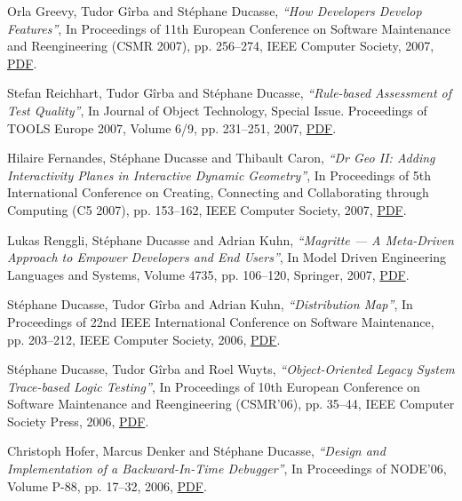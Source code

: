 \documentclass{article}
\newcommand{\czauthors}[1]{#1}
\newcommand{\cztitle}[1]{\emph{``#1''}}
\newcommand{\czbooktitle}[1]{#1}
\begin{document}
\begin{itemize}
	\pub  \czauthors{Orla Greevy, Tudor G\^irba and St\'ephane Ducasse},  \cztitle{How Developers Develop Features},  In \czbooktitle{Proceedings of 11th European Conference on Software Maintenance and Reengineering (CSMR 2007)}, pp. 256--274, IEEE Computer Society, 2007, \href{http://rmod-files.lille.inria.fr/Team/Texts/Papers/Gree07aDevelopersDevelopFeatures.pdf}{PDF}.

	\pub  \czauthors{Stefan Reichhart, Tudor G\^irba and St\'ephane Ducasse},  \cztitle{Rule-based Assessment of Test Quality},  In \czbooktitle{Journal of Object Technology, Special Issue. Proceedings of TOOLS Europe 2007}, Volume 6/9, pp. 231--251, 2007, \href{http://rmod-files.lille.inria.fr/Team/Texts/Papers/Reic07aTestQualityAssessment.pdf}{PDF}.

	\pub  \czauthors{Hilaire Fernandes, St\'ephane Ducasse and Thibault Caron},  \cztitle{{Dr Geo II}: Adding Interactivity Planes in Interactive Dynamic Geometry},  In \czbooktitle{Proceedings of 5th International Conference on Creating, Connecting and Collaborating through Computing (C5 2007)}, pp. 153--162, IEEE Computer Society, 2007, \href{http://rmod-files.lille.inria.fr/Team/Texts/Papers/Fern07a-C5-DrIIInterfactiveMultimodal.pdf}{PDF}.

	\pub  \czauthors{Lukas Renggli, St\'ephane Ducasse and Adrian Kuhn},  \cztitle{Magritte --- A Meta-Driven Approach to Empower Developers and End Users},  In \czbooktitle{Model Driven Engineering Languages and Systems}, Volume 4735, pp. 106--120, Springer, 2007, \href{http://rmod-files.lille.inria.fr/Team/Texts/Papers/Reng07aMagritte.pdf}{PDF}.

	\pub  \czauthors{St\'ephane Ducasse, Tudor G\^irba and Adrian Kuhn},  \cztitle{Distribution Map},  In \czbooktitle{Proceedings of 22nd IEEE International Conference on Software Maintenance}, pp. 203--212, IEEE Computer Society, 2006, \href{http://rmod-files.lille.inria.fr/Team/Texts/Papers/Duca06cDistributionMap.pdf}{PDF}.

	\pub  \czauthors{St\'ephane Ducasse, Tudor G\^irba and Roel Wuyts},  \cztitle{Object-Oriented Legacy System Trace-based Logic Testing},  In \czbooktitle{Proceedings of 10th European Conference on Software Maintenance and Reengineering (CSMR'06)}, pp. 35--44, IEEE Computer Society Press, 2006, \href{http://rmod-files.lille.inria.fr/Team/Texts/Papers/Duca06aTestLogtestingCSMR.pdf}{PDF}.

	\pub  \czauthors{Christoph Hofer, Marcus Denker and St\'ephane Ducasse},  \cztitle{Design and Implementation of a Backward-In-Time Debugger},  In \czbooktitle{Proceedings of NODE'06}, Volume P-88, pp. 17--32, 2006, \href{http://rmod-files.lille.inria.fr/Team/Texts/Papers/Hofe06a-NODE06-Unstuck.pdf}{PDF}.


\end{itemize}
\end{document}

